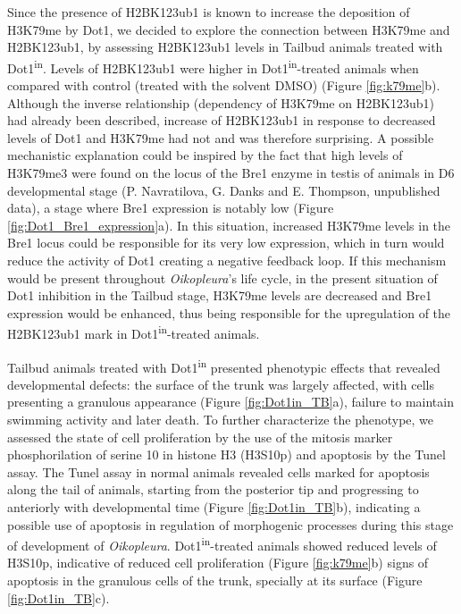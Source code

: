 \documentclass[11pt,twoside,a4paper]{report}
\begin{document}
	Since the presence of H2BK123ub1 is known to increase the deposition of H3K79me by Dot1, we decided to explore the connection between H3K79me and H2BK123ub1, by assessing H2BK123ub1 levels in Tailbud animals treated with Dot1\textsuperscript{in}. Levels of H2BK123ub1 were higher in Dot1\textsuperscript{in}-treated animals when compared with control (treated with the solvent DMSO) (Figure \ref{fig:k79me}b). Although the inverse relationship (dependency of H3K79me on H2BK123ub1) had already been described, increase of H2BK123ub1 in response to decreased levels of Dot1 and H3K79me had not and was therefore surprising. A possible mechanistic explanation could be inspired by the fact that high levels of H3K79me3 were found on the locus of the Bre1 enzyme in testis of animals in D6 developmental stage (P. Navratilova, G. Danks and E. Thompson, unpublished data), a stage where Bre1 expression is notably low (Figure \ref{fig:Dot1_Bre1_expression}a). In this situation, increased H3K79me levels in the Bre1 locus could be responsible for its very low expression, which in turn would reduce the activity of Dot1 creating a negative feedback loop. If this mechanism would be present throughout \textit{Oikopleura}'s life cycle, in the present situation of Dot1 inhibition in the Tailbud stage, H3K79me levels are decreased and Bre1 expression would be enhanced, thus being responsible for the upregulation of the H2BK123ub1 mark in Dot1\textsuperscript{in}-treated animals.
	
	Tailbud animals treated with Dot1\textsuperscript{in} presented phenotypic effects that revealed developmental defects: the surface of the trunk was largely affected, with cells presenting a granulous appearance (Figure \ref{fig:Dot1in_TB}a), failure to maintain swimming activity and later death. To further characterize the phenotype, we assessed the state of cell proliferation by the use of the mitosis marker phosphorilation of serine 10 in histone H3 (H3S10p) and apoptosis by the Tunel assay. The Tunel assay in normal animals revealed cells marked for apoptosis along the tail of animals, starting from the posterior tip and progressing to anteriorly with developmental time (Figure \ref{fig:Dot1in_TB}b), indicating a possible use of apoptosis in regulation of morphogenic processes during this stage of development of \textit{Oikopleura}. Dot1\textsuperscript{in}-treated animals showed reduced levels of H3S10p, indicative of reduced cell proliferation (Figure \ref{fig:k79me}b) signs of apoptosis in the granulous cells of the trunk, specially at its surface (Figure \ref{fig:Dot1in_TB}c).
	
\end{document}
